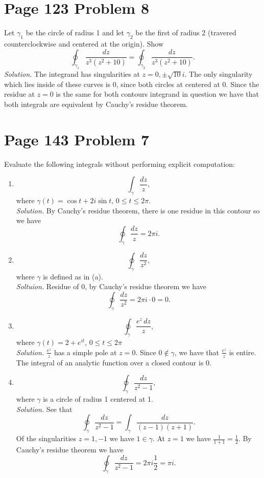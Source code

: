 \documentclass[12pt]{article}
\begin{document}
\section*{Page 123 Problem 8} Let $\gamma_1$ be the circle of radius 1 and let $\gamma_2$ be the first of radius 2 (travered counterclockwise and centered at the origin). Show
\[
    \oint_{\gamma_1}\frac{dz}{z^3(z^2+10)}=\oint_{\gamma_2}\frac{dz}{z^3(z^2+10)}.
\]
\textit{Solution.} The integrand has singularities at $z=0,\pm\sqrt{10}i$. The only singularity which lies inside of these curves is $0$, since both circles at centered at 0. Since the residue at $z=0$ is the same for both contours integrand in question we have that both integrals are equivalent by Cauchy's residue theorem.


\section*{Page 143 Problem 7} Evaluate the following integrals without performing explicit computation:
\begin{enumerate}[label=(\alph*)]
    \item 
    \[
        \int_{\gamma}\frac{dz}{z},
    \]
    where $\gamma(t)=\cos t+2i\sin t,\,0\leq t\leq2\pi$.\\
    \textit{Solution.} By Cauchy's residue theorem, there is one residue in this contour so we have
    \[
        \oint_{\gamma}\frac{dz}{z}=2\pi i.
    \]
    \item 
    \[
        \oint_{\gamma}\frac{dz}{z^2},
    \]
    where $\gamma$ is defined as in (a).\\
    \textit{Soltuion.} Residue of 0, by Cauchy's residue theorem we have
    \[
        \oint_{\gamma}\frac{dz}{z^2}=2\pi i\cdot 0=0.
    \]    
    \item 
    \[
        \oint_{\gamma}\frac{e^z\,dz}{z},
    \]
    where $\gamma(t)=2+e^{it},\,0\leq t\leq2\pi$\\
    \textit{Solution.} $\frac{e^z}{z}$ has a simple pole at $z=0$. Since $0\not\in\gamma$, we have that $\frac{e^z}{z}$ is entire. The integral of an analytic function over a closed contour is 0.
    \item 
    \[
        \oint_{\gamma}\frac{dz}{z^2-1},
    \]
    where $\gamma$ is a circle of radius 1 centered at 1.\\
    \textit{Solution.} See that
    \[
        \oint_{\gamma}\frac{dz}{z^2-1}=\int_{\gamma}\frac{dz}{(z-1)(z+1)}.
    \]
    Of the singularities $z=1,-1$ we have $1\in\gamma$. At $z=1$ we have $\frac{1}{1+1}=\frac{1}{2}$. By Cauchy's residue theorem we have
    \[
        \oint_{\gamma}\frac{dz}{z^2-1}=2\pi i\frac{1}{2}=\pi i.
    \]
\end{enumerate}
\end{document}
